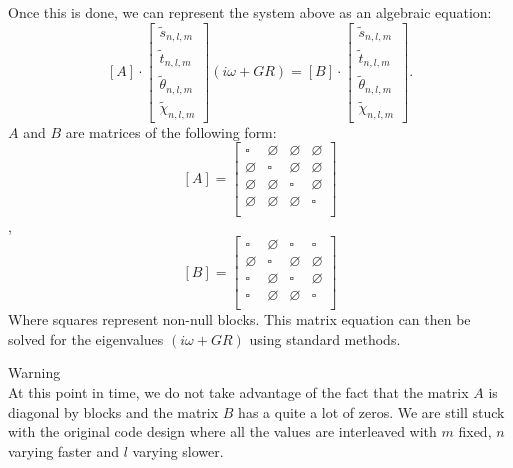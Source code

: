 \documentclass[a4paper,10pt]{book}
\newcommand{\warningbox}[1]{\fcolorbox{orange}{white}%
{\centering \parbox{0.9\textwidth}{ {\Large \red{Warning}}%
\vspace*{2mm}\\%
#1}}}
\newcommand\red[1]{{\color{red} #1}}
\begin{document}
Once this is done, we can represent the system above as an algebraic equation:
\begin{equation}
 \left[ A \right] \cdot
 \begin{bmatrix}
    \tilde s_{n,l,m}\\
    \tilde t_{n,l,m}\\
    \tilde \theta_{n,l,m}\\
    \tilde \chi_{n,l,m}
\end{bmatrix}
(i\omega +GR)  =
 \left[ B \right]
        \cdot
        \begin{bmatrix}
        \tilde s_{n,l,m}\\
        \tilde t_{n,l,m}\\
        \tilde \theta_{n,l,m}\\
        \tilde \chi_{n,l,m}
        \end{bmatrix}.
\end{equation}
$A$ and $B$ are matrices of the following form:
\begin{equation}
\left[ A \right] =
\begin{bmatrix}
\square     & \varnothing & \varnothing & \varnothing \\
\varnothing & \square     & \varnothing & \varnothing \\
\varnothing & \varnothing & \square     & \varnothing \\
\varnothing & \varnothing & \varnothing & \square \\
\end{bmatrix}
\end{equation},
\begin{equation}
\left[ B \right] =
\begin{bmatrix}
\square     & \varnothing & \square     & \square     \\
\varnothing & \square     & \varnothing & \varnothing \\
\square     & \varnothing & \square     & \varnothing \\
\square     & \varnothing & \varnothing & \square     \\
\end{bmatrix}
\end{equation}
Where squares represent non-null blocks.
This matrix equation can then be solved for the eigenvalues $(i\omega +GR)$
using standard methods.

\warningbox{
At this point in time, we do not take advantage of the fact that the matrix $A$
is diagonal by blocks and the matrix $B$ has a quite a lot of zeros. We are
still stuck with the original code design where all the values are interleaved
with $m$ fixed, $n$ varying faster and $l$ varying slower.
}
\end{document}
